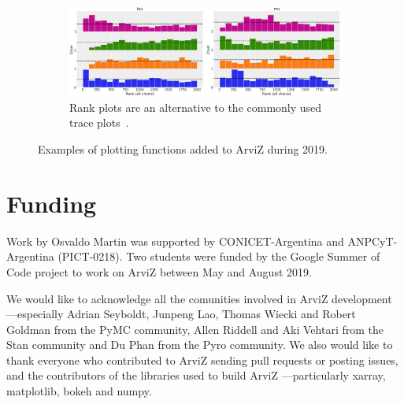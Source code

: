 \documentclass[anonymous=false, %
               format=acmsmall, %
               review=true, %
               screen=true, %
               nonacm=true]{acmart}
\begin{document}
\begin{figure}[!htb]
\begin{subfigure}{0.98\textwidth}
  \centering
    \includegraphics[width=\linewidth]{plot_rank.png}
    \caption{Rank plots are an alternative to the commonly used trace
      plots~\cite{vehtari2019rank}.}\label{fig:n2}
  \end{subfigure}
  \caption{Examples of plotting functions added to ArviZ during
  2019.}\label{fig:examples}
\end{figure}

\section*{Funding}
Work by Osvaldo Martin was supported by CONICET-Argentina and ANPCyT-Argentina
(PICT-0218). Two students were funded by the Google Summer of Code project to
work on ArviZ between May and August 2019.

\begin{acks}
  We would like to acknowledge all the comunities involved in ArviZ
  development ---especially Adrian Seyboldt, Junpeng Lao,
  Thomas Wiecki and Robert Goldman from the PyMC community, Allen Riddell and
  Aki Vehtari from the Stan community and Du Phan from the Pyro community.
  We also would like to thank everyone who contributed to ArviZ sending pull
  requests or posting issues, and the contributors of the libraries used to
  build ArviZ ---particularly xarray, matplotlib, bokeh and numpy.
\end{acks}




\end{document}
